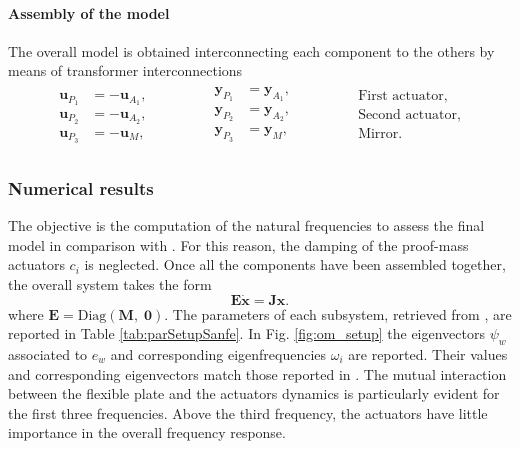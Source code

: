 \paragraph{Assembly of the model} The overall model is obtained interconnecting each component to the others by means of transformer interconnections
\begin{align*}
\begin{aligned}
\mathbf{u}_{P_1} &= - \mathbf{u}_{A_1}, \\
\mathbf{u}_{P_2} &= - \mathbf{u}_{A_2}, \\
\mathbf{u}_{P_3} &= - \mathbf{u}_{M},
\end{aligned}\qquad \qquad
\begin{aligned}
\mathbf{y}_{P_1} &= \mathbf{y}_{A_1}, \\
\mathbf{y}_{P_2} &= \mathbf{y}_{A_2}, \\
\mathbf{y}_{P_3} &= \mathbf{y}_{M}, \\
\end{aligned}\qquad \qquad
\begin{aligned}
\text{First actuator}, \\
\text{Second actuator}, \\
\text{Mirror}. \\
\end{aligned}
\end{align*}



\subsubsection{Numerical results}
The objective is the computation of the natural frequencies to assess the final model in comparison with \cite{preda2020}. For this reason, the damping of the proof-mass actuators $c_i$ is neglected. Once all the components have been assembled together, the overall system takes the form
\begin{equation*}
\mathbf{E} \dot{ \mathbf{x} } = \mathbf{J}\mathbf{x}.
\end{equation*}
where $\mathbf{E} = \mathrm{Diag}(\mathbf{M}, \; \mathbf{0})$. The parameters of each subsystem, retrieved from \cite{sanfedino2019phd}, are reported in Table \ref{tab:parSetupSanfe}. In Fig. \ref{fig:om_setup} the eigenvectors $\psi_w$ associated to $e_w$ and corresponding eigenfrequencies $\omega_i$ are reported. Their values and corresponding eigenvectors match those reported in \cite{preda2020,sanfedino2019phd}. The mutual interaction between the flexible plate and the actuators dynamics is particularly evident for the first three frequencies. Above the third frequency, the actuators have little importance in the overall frequency response.

